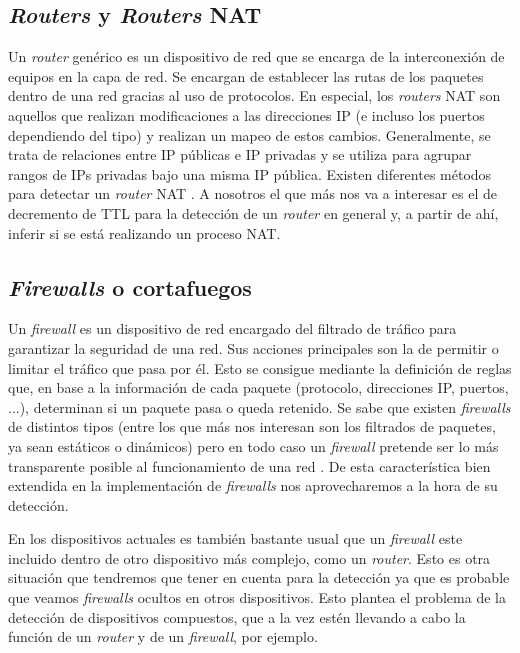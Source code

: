 \documentclass[twoside, 12pt]{epstfg}
\begin{document}
\subsection{\textit{Routers} y \textit{Routers} NAT}
Un \textit{router} genérico es un dispositivo de red que se encarga de la interconexión de equipos en la capa de red. Se encargan de establecer las rutas de los paquetes dentro de una red gracias al uso de protocolos. En especial, los \textit{routers} NAT son aquellos que realizan modificaciones a las direcciones IP (e incluso los puertos dependiendo del tipo) y realizan un mapeo de estos cambios. Generalmente, se trata de relaciones entre IP públicas e IP privadas y se utiliza para agrupar rangos de IPs privadas bajo una misma IP pública. Existen diferentes métodos para detectar un \textit{router} NAT \cite{Krmicek}. A nosotros el que más nos va a interesar es el de decremento de TTL para la detección de un \textit{router} en general y, a partir de ahí, inferir si se está realizando un proceso NAT.

\subsection{\textit{Firewalls} o cortafuegos}
\label{subsec:Estado:Deteccion:Firewalls}
Un \textit{firewall} es un dispositivo de red encargado del filtrado de tráfico para garantizar la seguridad de una red. Sus acciones principales son la de permitir o limitar el tráfico que pasa por él. Esto se consigue mediante la definición de reglas que, en base a la información de cada paquete (protocolo, direcciones IP, puertos, ...), determinan si un paquete pasa o queda retenido. Se sabe que existen \textit{firewalls} de distintos tipos (entre los que más nos interesan son los filtrados de paquetes, ya sean estáticos o dinámicos) pero en todo caso un \textit{firewall} pretende ser lo más transparente posible al funcionamiento de una red \cite{Cheswick2003}. De esta característica bien extendida en la implementación de \textit{firewalls} nos aprovecharemos a la hora de su detección.

En los dispositivos actuales es también bastante usual que un \textit{firewall} este incluido dentro de otro dispositivo más complejo, como un \textit{router}. Esto es otra situación que tendremos que tener en cuenta para la detección ya que es probable que veamos \textit{firewalls} ocultos en otros dispositivos. Esto plantea el problema de la detección de dispositivos compuestos, que a la vez estén llevando a cabo la función de un \textit{router} y de un \textit{firewall}, por ejemplo.
\end{document}
